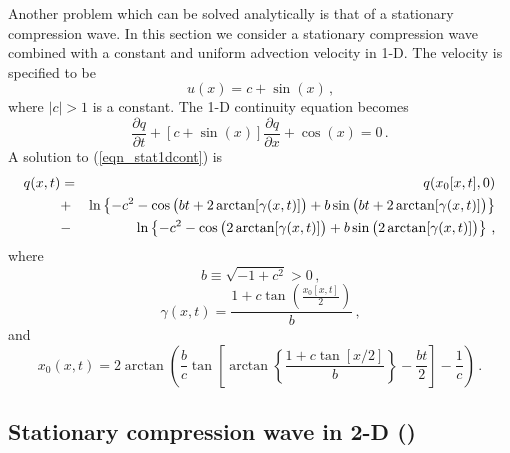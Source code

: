\documentclass[11pt]{book}
\begin{document}
Another problem which can be solved analytically is that of a stationary compression wave.  In this section we consider a stationary compression wave combined with a constant and uniform advection velocity in 1-D.  The velocity is specified to be
\begin{equation}
\label{eqn_statu1d}
u(x) = c + \sin(x) \,\mbox{,}
\end{equation}
where $|c|>1$ is a constant.  The 1-D continuity equation becomes
\begin{equation}
\label{eqn_stat1dcont}
\frac{\partial q}{\partial t} + [c + \sin(x)] \frac{\partial q}{\partial x} + \cos(x) = 0 \,\mbox{.}
\end{equation}
A solution to (\ref{eqn_stat1dcont}) is
\begin{eqnarray}
\label{eqn_stat1dsoln}
q(x,t) &=& q(x_0[x,t],0) \nonumber \vspace{0.3cm}\\
&+& \ln\left\{ -c^2 - \cos\big(bt + 2\arctan[\gamma(x,t)] \big) + b\sin\big(bt + 2\arctan[\gamma(x,t)] \big) \right\} \nonumber \vspace{0.3cm}\\
&-& \ln\left\{ -c^2 - \cos\big( 2\arctan[\gamma(x,t)] \big) + b\sin\big( 2\arctan[\gamma(x,t)] \big) \right\} \,\mbox{,}
\end{eqnarray}
where
\begin{equation}
\label{eqn_b}
b \equiv \sqrt{-1 + c^2} > 0 \,\mbox{,}
\end{equation}
\begin{equation}
\label{eqn_gamma}
\gamma(x,t) = \frac{ 1 + c\tan\left( \frac{x_0[x,t]}{2} \right) }{b} \,\mbox{,}
\end{equation}
and
\begin{equation}
\label{eqn_stat1dx0}
x_0(x,t) = 2\arctan\left( \frac{b}{c} \tan \left[ \arctan\left\{ \frac{1+c\tan[x/2]}{b} \right\} - \frac{bt}{2} \right] - \frac{1}{c} \right) \,\mbox{.}
\end{equation}

\subsection{Stationary compression wave in 2-D (\texorpdfstring{}{compression\_wave})}
\label{stationary_2d}
\end{document}
